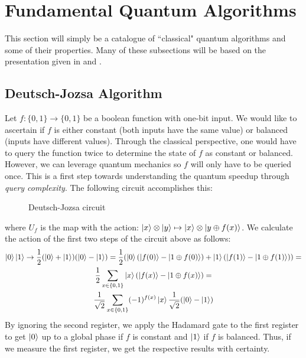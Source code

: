 \section{Fundamental Quantum Algorithms}

This section will simply be a catalogue of ``classical" quantum algorithms and some of their properties. Many of these subsections will be based on the presentation given in \cite{childs17} and \cite{batty2004quantum}.

\subsection{Deutsch-Jozsa Algorithm}
Let $f: \{0,1\} \rightarrow \{0,1\}$ be a boolean function with one-bit input. We would like to ascertain if $f$ is either constant (both inputs have the same value) or balanced (inputs have different values). Through the classical perspective, one would have to query the function twice to determine the state of $f$ as constant or balanced. However, we can leverage quantum mechanics so $f$ will only have to be queried once. This is a first step towards understanding the quantum speedup through \emph{query complexity}.
%
The following circuit accomplishes this:

\begin{figure}[ht]
    \centering
    \leavevmode
    \caption{Deutsch-Jozsa circuit}
\end{figure}
%
where $U_f$ is the map with the action: $\ket{x}\otimes\ket{y} \mapsto \ket{x}\otimes\ket{y \oplus f(x)}$. We calculate the action of the first two steps of the circuit above as follows:
%
\begin{gather}
  \ket{0}\ket{1} \rightarrow \frac{1}{2}(\ket{0} + \ket{1})(\ket{0} - \ket{1}) = \frac{1}{2}(\ket{0}(\ket{f(0)} - \ket{1 \oplus f(0)}) + \ket{1}(\ket{f(1)} - \ket{1 \oplus f(1)})) = \\
  \frac{1}{2}\sum_{x \in \{0,1\}} \ket{x}(\ket{f(x)} - \ket{1 \oplus f(x)}) = \\
  \frac{1}{\sqrt{2}} \sum_{x \in \{0,1\}} (-1)^{f(x)}\ket{x} \frac{1}{\sqrt{2}}(\ket{0} -
  \ket{1})
\end{gather}
By ignoring the second register, we apply the Hadamard gate to the first register to get $\ket{0}$ up to a global phase if $f$ is constant and $\ket{1}$ if $f$ is balanced. Thus, if we measure the first register, we get the respective results with certainty.

